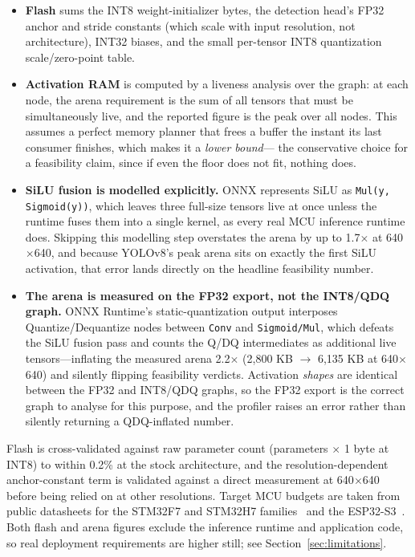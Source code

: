 \documentclass[11pt]{article}
\begin{document}
\begin{itemize}[leftmargin=1.4em, itemsep=0.1em]
  \item \textbf{Flash} sums the INT8 weight-initializer bytes, the detection
  head's FP32 anchor and stride constants (which scale with input
  resolution, not architecture), INT32 biases, and the small per-tensor INT8
  quantization scale/zero-point table.
  \item \textbf{Activation RAM} is computed by a liveness analysis over the
  graph: at each node, the arena requirement is the sum of all tensors that
  must be simultaneously live, and the reported figure is the peak over all
  nodes. This assumes a perfect memory planner that frees a buffer the
  instant its last consumer finishes, which makes it a \emph{lower bound}---
  the conservative choice for a feasibility claim, since if even the floor
  does not fit, nothing does.
  \item \textbf{SiLU fusion is modelled explicitly.} ONNX represents SiLU as
  \texttt{Mul(y, Sigmoid(y))}, which leaves three full-size tensors live at
  once unless the runtime fuses them into a single kernel, as every real MCU
  inference runtime does. Skipping this modelling step overstates the arena
  by up to 1.7$\times$ at 640$\times$640, and because YOLOv8's peak arena
  sits on exactly the first SiLU activation, that error lands directly on
  the headline feasibility number.
  \item \textbf{The arena is measured on the FP32 export, not the INT8/QDQ
  graph.} ONNX Runtime's static-quantization output interposes
  Quantize/Dequantize nodes between \texttt{Conv} and \texttt{Sigmoid/Mul},
  which defeats the SiLU fusion pass and counts the Q/DQ intermediates as
  additional live tensors---inflating the measured arena 2.2$\times$ (2{,}800
  KB $\to$ 6{,}135 KB at 640$\times$640) and silently flipping feasibility
  verdicts. Activation \emph{shapes} are identical between the FP32 and
  INT8/QDQ graphs, so the FP32 export is the correct graph to analyse for
  this purpose, and the profiler raises an error rather than silently
  returning a QDQ-inflated number.
\end{itemize}

Flash is cross-validated against raw parameter count (parameters $\times$ 1
byte at INT8) to within 0.2\% at the stock architecture, and the
resolution-dependent anchor-constant term is validated against a direct
measurement at 640$\times$640 before being relied on at other resolutions.
Target MCU budgets are taken from public datasheets for the STM32F7 and
STM32H7 families~\cite{stm32f7, stm32h7} and the ESP32-S3~\cite{esp32s3}.
Both flash and arena figures exclude the inference runtime and application
code, so real deployment requirements are higher still; see
Section~\ref{sec:limitations}.
\end{document}

